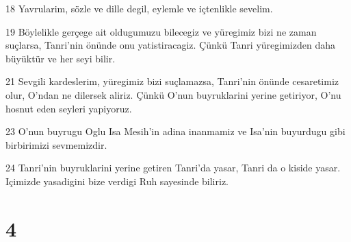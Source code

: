 \par 18 Yavrularim, sözle ve dille degil, eylemle ve içtenlikle sevelim.
\par 19 Böylelikle gerçege ait oldugumuzu bilecegiz ve yüregimiz bizi ne zaman suçlarsa, Tanri'nin önünde onu yatistiracagiz. Çünkü Tanri yüregimizden daha büyüktür ve her seyi bilir.
\par 21 Sevgili kardeslerim, yüregimiz bizi suçlamazsa, Tanri'nin önünde cesaretimiz olur, O'ndan ne dilersek aliriz. Çünkü O'nun buyruklarini yerine getiriyor, O'nu hosnut eden seyleri yapiyoruz.
\par 23 O'nun buyrugu Oglu Isa Mesih'in adina inanmamiz ve Isa'nin buyurdugu gibi birbirimizi sevmemizdir.
\par 24 Tanri'nin buyruklarini yerine getiren Tanri'da yasar, Tanri da o kiside yasar. Içimizde yasadigini bize verdigi Ruh sayesinde biliriz.

\chapter{4}

